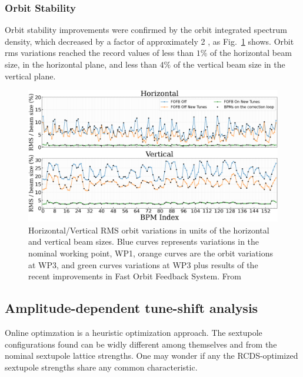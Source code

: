 \subsubsection{Orbit Stability}
Orbit stability improvements were confirmed by the orbit integrated spectrum density, which decreased by a factor of approximately 2 \cite{liu_status_2023}, as Fig.~\ref{fig:integrated_spec} shows. Orbit rms variations reached the record values of less than $1\%$ of the horizontal beam size, in the horizontal plane, and less than $4\%$ of the vertical beam size in the vertical plane.


\begin{figure}[tb]
    \centering
    \includegraphics[width=\textwidth]{Images/WEOGA2_f5.png}
    \caption[Horizontal/Vertical RMS orbit variations in units of the horizontal and vertical beam sizes.]{Horizontal/Vertical RMS orbit variations in units of the horizontal and vertical beam sizes. Blue curves represents variations in the nominal working point, WP1, orange curves are the orbit variations at WP3, and green curves variations at WP3 plus results of the recent improvements in Fast Orbit Feedback System. From~\cite{liu_status_2023}}
    \label{fig:integrated_spec}
\end{figure}

\subsection{Amplitude-dependent tune-shift analysis}
Online optimzation is a heuristic optimization approach. The sextupole configurations found can be widly different among themselves and from the nominal sextupole lattice strengths. One may wonder if any the RCDS-optimized sextupole strengths share any common characteristic.


